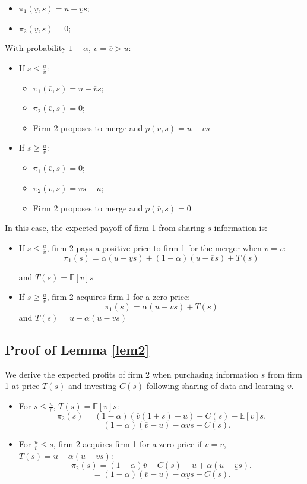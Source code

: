 \documentclass[a4paper,leqno]{article}%
\newcommand{\E}{\mathbb E}
\renewcommand{\a}{\alpha}
\newcommand{\uv}{\underline{v}}
\newcommand{\ov}{\overline{v}}
\begin{document}
\begin{itemize}
    \item $\pi_1(\uv,s)=u-\uv s$;
    \item $\pi_2(\uv,s)=0$;
\end{itemize}

With probability $1-\a$, $v=\ov>u$:

\begin{itemize}
    \item If $s\leq \frac{u}{\ov}$:
\begin{itemize}
    \item $\pi_1(\ov,s)=u-\ov s$;
    \item $\pi_2(\ov,s)=0$;
    \item Firm 2 proposes to merge and $p(\ov,s)=u-\ov s$
\end{itemize}
    \item If $s\geq \frac{u}{\ov}$:
\begin{itemize}
    \item $\pi_1(\ov,s)=0$;
    \item $\pi_2(\ov,s)=\ov s-u$;
    \item Firm 2 proposes to merge and $p(\ov,s)=0$
\end{itemize}
\end{itemize}

In this case, the expected payoff of firm 1 from sharing $s$ information is:

\begin{itemize}
    \item If $s\leq \frac{u}{\ov}$, firm 2 pays a positive price to firm 1 for the merger when $v=\ov$:
    $$\pi_1(s)=\a(u-\uv s)+(1-\a)(u-\ov s)+T(s)$$
    
    and $T(s)=\E[v]s$
    \item If $s\geq \frac{u}{\ov}$, firm 2 acquires firm 1 for a zero price:
    $$\pi_1(s)=\a(u-\uv s)+T(s)$$
    and $T(s)=u-\a(u-\uv s)$
\end{itemize}


\subsection{Proof of Lemma \ref{lem2}}\label{lem2p}

We derive the expected profits of firm 2 when purchasing information $s$ from firm 1 at price $T(s)$ and investing $C(s)$ following sharing of data and learning $v$.

\begin{itemize}
    \item For $s\leq \frac{u}{\ov}$, $T(s)=\E[v]s$:
        $$\pi_2(s)=(1-\a)(\ov(1+s)-u)-C(s)-\E[v]s.$$
        $$=(1-\a)(\ov -u)-\a \uv s-C(s).$$

    \item For $\frac{u}{\ov}\leq s$, firm 2 acquires firm 1 for a zero price if $v=\ov$, $T(s)=u-\a(u-\uv s)$:
        $$\pi_2(s)=(1-\a)\ov-C(s)-u+\a(u-\uv s).$$
        $$=(1-\a)(\ov -u)-\a \uv s-C(s).$$
\end{itemize}
\end{document}
